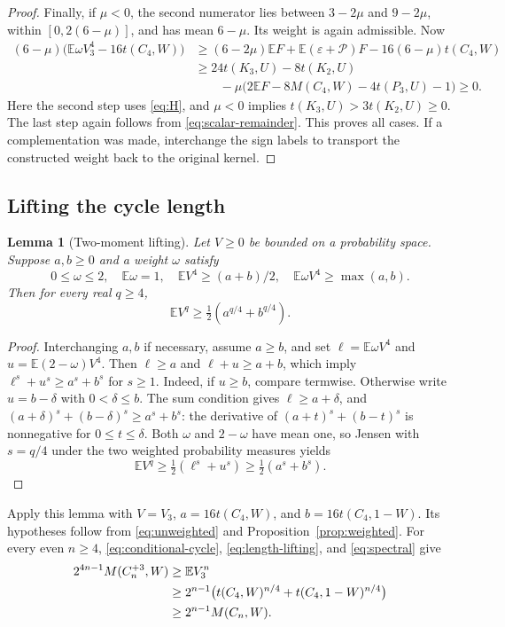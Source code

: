 \documentclass[11pt,a4paper]{article}
\newtheorem{lemma}[theorem]{Lemma}
\theoremstyle{remark}
\numberwithin{equation}{section}
\newcommand{\E}{\mathbb E}
\newcommand{\maj}{\mathcal P}
\begin{document}
\begin{proof}
Finally, if $\mu<0$, the second numerator lies
between $3-2\mu$ and $9-2\mu$, within $[0,2(6-\mu)]$,
and has mean $6-\mu$. Its weight is again admissible. Now
\begin{align*}
 (6-\mu)\bigl(\E\omega V_3^4-16t(C_4,W)\bigr)
 &\geq(6-2\mu)\E F+\E(\varepsilon+\maj)F
                                  -16(6-\mu)t(C_4,W)\\
 &\geq24t(K_3,U)-8t(K_2,U)\\
 &\qquad-\mu\bigl(2\E F-8M(C_4,W)-4t(P_3,U)-1\bigr)
 \geq0.
\end{align*}
Here the second step uses \eqref{eq:H}, and $\mu<0$ implies
$t(K_3,U)>3t(K_2,U)\geq0$. The last step again follows from
\eqref{eq:scalar-remainder}. This proves all cases.
If a complementation was made, interchange the sign labels to
transport the constructed weight back to the original kernel.
\end{proof}

\subsection{Lifting the cycle length}

\begin{lemma}[Two-moment lifting]\label{lem:length-lifting}
Let $V\geq0$ be bounded on a probability space. Suppose
$a,b\geq0$ and a weight $\omega$ satisfy
\[
 0\leq\omega\leq2,\quad\E\omega=1,\quad
 \E V^4\geq(a+b)/2,\quad
 \E\omega V^4\geq\max(a,b).
\]
Then for every real $q\geq4$,
\begin{equation}\label{eq:length-lifting}
 \E V^q\geq\tfrac12(a^{q/4}+b^{q/4}).
\end{equation}
\end{lemma}
\begin{proof}
Interchanging $a,b$ if necessary, assume $a\geq b$, and set
$\ell=\E\omega V^4$ and $u=\E(2-\omega)V^4$.
Then $\ell\geq a$ and $\ell+u\geq a+b$, which imply
$\ell^s+u^s\geq a^s+b^s$ for $s\geq1$.
Indeed, if $u\geq b$, compare termwise. Otherwise write
$u=b-\delta$ with $0<\delta\leq b$. The sum condition gives
$\ell\geq a+\delta$, and
$(a+\delta)^s+(b-\delta)^s\geq a^s+b^s$:
the derivative of $(a+t)^s+(b-t)^s$ is nonnegative for
$0\leq t\leq\delta$.
Both $\omega$ and $2-\omega$ have mean one, so Jensen with
$s=q/4$ under the two weighted probability measures yields
\[
 \E V^q\geq\tfrac12(\ell^s+u^s)
             \geq\tfrac12(a^s+b^s).
\]
\end{proof}

Apply this lemma with $V=V_3$, $a=16t(C_4,W)$, and
$b=16t(C_4,1-W)$. Its hypotheses follow from
\eqref{eq:unweighted} and Proposition~\ref{prop:weighted}.
For every even $n\geq4$, \eqref{eq:conditional-cycle},
\eqref{eq:length-lifting}, and \eqref{eq:spectral} give
\begin{align}
 2^{4n-1}M(C_n^{+3},W)
 &\geq\E V_3^n\notag\\
 &\geq2^{n-1}\bigl(t(C_4,W)^{n/4}+t(C_4,1-W)^{n/4}\bigr)
 \notag\\
 &\geq2^{n-1}M(C_n,W).
 \label{eq:three-apices}
\end{align}
\end{document}
